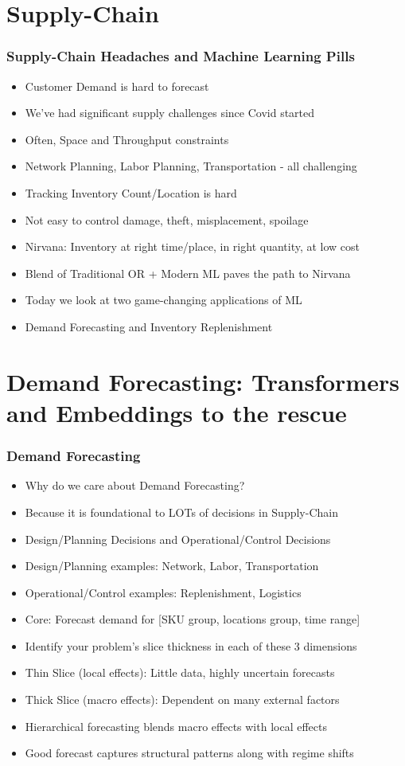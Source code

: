 \documentclass[handout]{beamer}
\begin{document}
\section{Supply-Chain}

\begin{frame}
\frametitle{Supply-Chain Headaches and Machine Learning Pills}
\pause
\begin{itemize}[<+->]
\item Customer Demand is hard to forecast
\item We've had significant supply challenges since Covid started
\item Often, Space and Throughput constraints
\item Network Planning, Labor Planning, Transportation - all challenging
\item Tracking Inventory Count/Location is hard
\item Not easy to control damage, theft, misplacement, spoilage
\item Nirvana: Inventory at right time/place, in right quantity, at low cost
\item Blend of Traditional OR + Modern ML paves the path to Nirvana
\item Today we look at two game-changing applications of ML
\item Demand Forecasting and Inventory Replenishment
\end{itemize}
\end{frame}

\section{Demand Forecasting: Transformers and Embeddings to the rescue}

\begin{frame}
\frametitle{Demand Forecasting}
\pause
\begin{itemize}[<+->]
\item Why do we care about Demand Forecasting?
\item Because it is foundational to LOTs of decisions in Supply-Chain
\item Design/Planning Decisions and Operational/Control Decisions
\item Design/Planning examples: Network, Labor, Transportation
\item Operational/Control examples: Replenishment, Logistics
\item Core: Forecast demand for [SKU group, locations group, time range]
\item Identify your problem's slice thickness in each of these 3 dimensions
\item Thin Slice (local effects): Little data, highly uncertain forecasts
\item Thick Slice (macro effects): Dependent on many external factors
\item Hierarchical forecasting blends macro effects with local effects
\item Good forecast captures structural patterns along with regime shifts
\end{itemize}
\end{frame}
\end{document}

